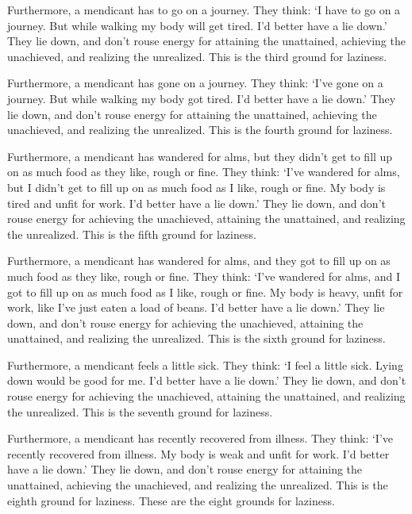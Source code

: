 \documentclass[12pt,openany]{book}%
\begin{document}
Furthermore, a mendicant has to go on a journey. They think: ‘I have to go on a journey. But while walking my body will get tired. I’d better have a lie down.’ They lie down, and don’t rouse energy for attaining the unattained, achieving the unachieved, and realizing the unrealized. This is the third ground for laziness. 

Furthermore, a mendicant has gone on a journey. They think: ‘I’ve gone on a journey. But while walking my body got tired. I’d better have a lie down.’ They lie down, and don’t rouse energy for attaining the unattained, achieving the unachieved, and realizing the unrealized. This is the fourth ground for laziness. 

Furthermore, a mendicant has wandered for alms, but they didn’t get to fill up on as much food as they like, rough or fine. They think: ‘I’ve wandered for alms, but I didn’t get to fill up on as much food as I like, rough or fine. My body is tired and unfit for work. I’d better have a lie down.’ They lie down, and don’t rouse energy for achieving the unachieved, attaining the unattained, and realizing the unrealized. This is the fifth ground for laziness. 

Furthermore, a mendicant has wandered for alms, and they got to fill up on as much food as they like, rough or fine. They think: ‘I’ve wandered for alms, and I got to fill up on as much food as I like, rough or fine. My body is heavy, unfit for work, like I’ve just eaten a load of beans. I’d better have a lie down.’ They lie down, and don’t rouse energy for achieving the unachieved, attaining the unattained, and realizing the unrealized. This is the sixth ground for laziness. 

Furthermore, a mendicant feels a little sick. They think: ‘I feel a little sick. Lying down would be good for me. I’d better have a lie down.’ They lie down, and don’t rouse energy for achieving the unachieved, attaining the unattained, and realizing the unrealized. This is the seventh ground for laziness. 

Furthermore, a mendicant has recently recovered from illness. They think: ‘I’ve recently recovered from illness. My body is weak and unfit for work. I’d better have a lie down.’ They lie down, and don’t rouse energy for attaining the unattained, achieving the unachieved, and realizing the unrealized. This is the eighth ground for laziness. These are the eight grounds for laziness. 
\end{document}
